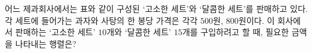 \hspace*{2mm}\begin{minipage}[t]{\dimexpr\linewidth-2mm\relax}\vspace{0pt}
어느 제과회사에서는 표와 같이 구성된 ‘고소한 세트’와 ‘달콤한 세트’를 판매하고 있다. 각 세트에 들어가는 과자와 사탕의 한 봉당 가격은 각각 $500$원, $800$원이다. 이 회사에서 판매하는 ‘고소한 세트’ $10$개와 ‘달콤한 세트’ $15$개를 구입하려고 할 때, 필요한 금액을 나타내는 행렬은? 
\par\smallskip\begin{center}\resizebox{\ifdim\width>\linewidth\linewidth\else\width\fi}{!}{}\end{center}

\end{minipage}
